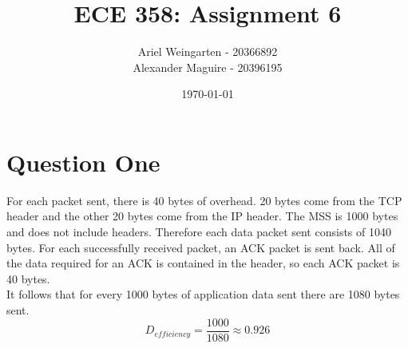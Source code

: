 \documentclass[a4paper]{article}
\title{ECE 358: Assignment 6}
\author{Ariel Weingarten - 20366892 \\
Alexander Maguire - 20396195}
\date{\today}
\begin{document}
\maketitle

\section{Question One}
For each packet sent, there is 40 bytes of overhead. 20 bytes come from the TCP header and the other 20 bytes come from the IP header. The MSS is 1000 bytes and does not include headers. Therefore each data packet sent consists of 1040 bytes. For each successfully received packet, an ACK packet is sent back. All of the data required for an ACK is contained in the header, so each ACK packet is 40 bytes. \\ 
It follows that for every 1000 bytes of application data sent there are 1080 bytes sent.
\[
	\mathit{D_{efficiency}} = \frac{1000}{1080} \approx 0.926
\]

\end{document}
